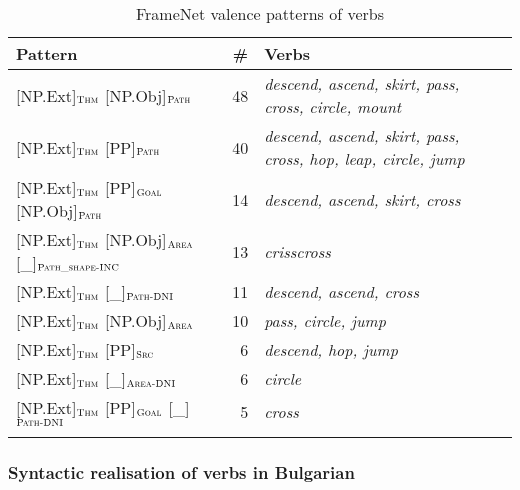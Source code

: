 \documentclass[output=paper,colorlinks,citecolor=brown]{langscibook}
\begin{document}
\begin{table}
   \begin{tabularx}{\textwidth}{ lrQ }
   \lsptoprule
   Pattern & \# & Verbs \\ \midrule
   {[NP.Ext]}$_{\text{\textsc{Thm}}}$ {[NP.Obj]}$_{\text{\textsc{Path}}}$  & 48 & \textit{descend, ascend, skirt, pass, cross, circle, mount}\\ 
{[NP.Ext]}$_{\text{\textsc{Thm}}}$ {[PP]}$_{\text{\textsc{Path}}}$  & 40 & \textit{descend, ascend, skirt, pass, cross, hop, leap, circle, jump}\\ 
{[NP.Ext]}$_{\text{\textsc{Thm}}}$ {[PP]}$_{\text{\textsc{Goal}}}$ {[NP.Obj]}$_{\text{\textsc{Path}}}$  & 14 & \textit{descend, ascend, skirt, cross}\\ 
{[NP.Ext]}$_{\text{\textsc{Thm}}}$ {[NP.Obj]}$_{\text{\textsc{Area}}}$ {[\_]}$_{\text{\textsc{Path\_shape-INC}}}$  & 13 & \textit{crisscross}\\ 
{[NP.Ext]}$_{\text{\textsc{Thm}}}$ {[\_]}$_{\text{\textsc{Path-DNI}}}$  & 11 & \textit{descend, ascend, cross}\\ 
{[NP.Ext]}$_{\text{\textsc{Thm}}}$ {[NP.Obj]}$_{\text{\textsc{Area}}}$  & 10 & \textit{pass, circle, jump}\\ 
{[NP.Ext]}$_{\text{\textsc{Thm}}}$ {[PP]}$_{\text{\textsc{Src}}}$  & 6 & \textit{descend, hop, jump}\\ 
{[NP.Ext]}$_{\text{\textsc{Thm}}}$ {[\_]}$_{\text{\textsc{Area-DNI}}}$  & 6 & \textit{circle}\\ 
{[NP.Ext]}$_{\text{\textsc{Thm}}}$ {[PP]}$_{\text{\textsc{Goal}}}$ {[\_]}$_{\text{\textsc{Path-DNI}}}$  & 5 & \textit{cross}\\ \lspbottomrule
\end{tabularx}
    \caption{FrameNet valence patterns of  verbs}
    \label{tab:4:traversing-valence-framenet}
\end{table} 

\subsubsection{Syntactic realisation of  verbs in Bulgarian}
\end{document}
